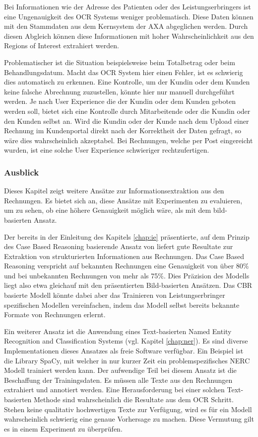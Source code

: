 Bei Informationen wie der Adresse des Patienten oder des Leistungserbringers ist eine Ungenauigkeit des OCR Systems weniger problematisch. Diese Daten können mit den Stammdaten aus dem Kernsystem der AXA abgeglichen werden. Durch diesen Abgleich können diese Informationen mit hoher Wahrscheinlichkeit aus den Regions of Interest extrahiert werden.

Problematischer ist die Situation beispielsweise beim Totalbetrag oder beim Behandlungsdatum. Macht das OCR System hier einen Fehler, ist es schwierig dies automatisch zu erkennen. Eine Kontrolle, um der Kundin oder dem Kunden keine falsche Abrechnung zuzustellen, könnte hier nur manuell durchgeführt werden. Je nach User Experience die der Kundin oder dem Kunden geboten werden soll, bietet sich eine Kontrolle durch Mitarbeitende oder die Kundin oder den Kunden selbst an. Wird die Kundin oder der Kunde nach dem Upload einer Rechnung im Kundenportal direkt nach der Korrektheit der Daten gefragt, so wäre dies wahrscheinlich akzeptabel. Bei Rechnungen, welche per Post eingereicht wurden, ist eine solche User Experience schwieriger rechtzufertigen.




\subsubsection{Ausblick}

Dieses Kapitel zeigt weitere Ansätze zur Informationsextraktion aus den Rechnungen. Es bietet sich an, diese Ansätze mit Experimenten zu evaluieren, um zu sehen, ob eine höhere Genauigkeit möglich wäre, als mit dem bild-basierten Ansatz.

Der bereits in der Einleitung des Kapitels \ref{chap:ie} präsentierte, auf dem Prinzip des Case Based Reasoning basierende Ansatz von \textcite{Hamza} liefert gute Resultate zur Extraktion von strukturierten Informationen aus Rechnungen. Das Case Based Reasoning verspricht auf bekannten Rechnungen eine Genauigkeit von über 80\% und bei unbekannten Rechnungen von mehr als 75\%. Dies Präzision des Modells liegt also etwa gleichauf mit den präsentierten Bild-basierten Ansätzen. Das CBR basierte Modell könnte dabei aber das Trainieren von Leistungserbringer spezifischen Modellen vereinfachen, indem das Modell selbst bereits bekannte Formate von Rechnungen erlernt.

Ein weiterer Ansatz ist die Anwendung eines Text-basierten Named Entity Recognition and Classification Systems (vgl. Kapitel \ref{chap:ner}). Es sind diverse Implementationen dieses Ansatzes als freie Software verfügbar. Ein Beispiel ist die Library SpaCy, mit welcher in nur kurzer Zeit ein problemspezifisches NERC Modell trainiert werden kann. Der aufwendige Teil bei diesem Ansatz ist die Beschaffung der Trainingsdaten. Es müssen alle Texte aus den Rechnungen extrahiert und annotiert werden. Eine Herausforderung bei einer solchen Text-basierten Methode sind wahrscheinlich die Resultate aus dem OCR Schritt. Stehen keine qualitativ hochwertigen Texte zur Verfügung, wird es für ein Modell wahrscheinlich schwierig eine genaue Vorhersage zu machen. Diese Vermutung gilt es in einem Experiment zu überprüfen.

